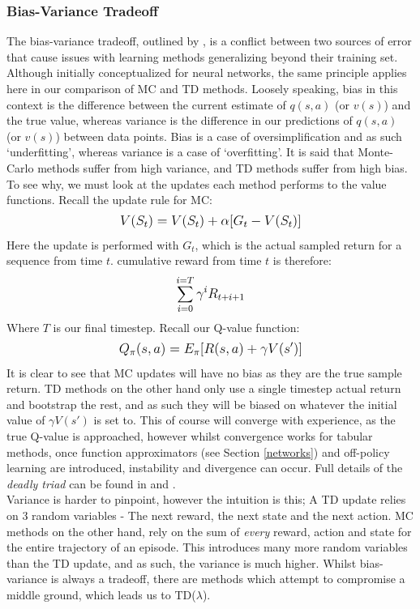 \documentclass[12pt]{article}
\begin{document}
\subsubsection{Bias-Variance Tradeoff}\label{bivary}
The bias-variance tradeoff, outlined by \textcite{GemanStuart1992NNat}, is a conflict between two sources of error that cause issues with learning methods generalizing beyond their training set. Although initially conceptualized for neural networks, the same principle applies here in our comparison of MC and TD methods. Loosely speaking, bias in this context is the difference between the current estimate of $q(s,a)$ (or $v(s)$) and the true value, whereas variance is the difference in our predictions of $q(s,a)$ (or $v(s)$) between data points. Bias is a case of oversimplification and as such `underfitting', whereas variance is a case of `overfitting'. It is said that Monte-Carlo methods suffer from high variance, and TD methods suffer from high bias. To see why, we must look at the updates each method performs to the value functions. Recall the update rule for MC: 
\begin{equation}
    \mathlarger{
        V(S_t) = V(S_t) + \alpha[G_t - V(S_t)]
    }
\end{equation}
Here the update is performed with $G_t$, which is the actual sampled return for a sequence from time $t$.  cumulative reward from time $t$ is therefore: 
\begin{equation}
    \mathlarger{
        \sum\limits_{i=0}^{i=T}\gamma^iR_{t+i+1}     
    }
\end{equation}
Where $T$ is our final timestep. Recall our Q-value function:
\begin{equation}
    \mathlarger{
        Q_{\pi}(s,a) = E_\pi[R(s,a) + \gamma V(s')]
    }
\end{equation}
It is clear to see that MC updates will have no bias as they are the true sample return. TD methods on the other hand only use a single timestep actual return and bootstrap the rest, and as such they will be biased on whatever the initial value of $\gamma V(s')$ is set to. This of course will converge with experience, as the true Q-value is approached, however   whilst convergence works for tabular methods, once function approximators (see Section \ref{networks}) and off-policy learning are introduced, instability and divergence can occur. Full details of the \textit{deadly triad} can be found in \textcite{Sutton1998} and \textcite{DBLP:journals/corr/abs-1812-02648}.
\\\newline Variance is harder to pinpoint, however the intuition is this; A TD update relies on 3 random variables - The next reward, the next state and the next action. MC methods on the other hand, rely on the sum of \textit{every} reward, action and state for the entire trajectory of an episode. This introduces many more random variables than the TD update, and as such, the variance is much higher. Whilst bias-variance is always a tradeoff, there are methods which attempt to compromise a middle ground, which leads us to TD($\lambda$).
\end{document}
